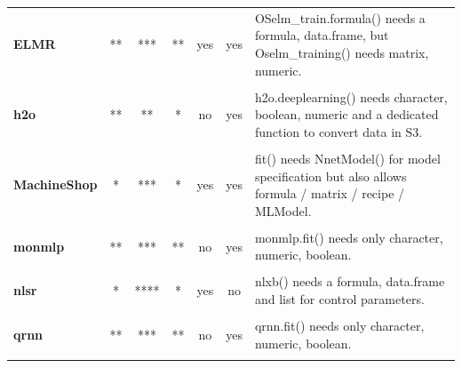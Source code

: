\begin{Schunk}
\begin{table}
\begin{tabular}[t]{>{}lccccc>{\raggedright\arraybackslash}p{30em}}
\textbf{ELMR} & ** & *** & ** & yes & yes & OSelm\_train.formula() needs a formula, data.frame, but Oselm\_training() needs matrix, numeric.\\
\cellcolor{gray!6}{\textbf{EnsembleBase}} & \cellcolor{gray!6}{*} & \cellcolor{gray!6}{*} & \cellcolor{gray!6}{*} & \cellcolor{gray!6}{yes} & \cellcolor{gray!6}{no} & \cellcolor{gray!6}{Regression.Batch.Fit() needs a function for model specification and a formula.}\\
\textbf{h2o} & ** & ** & * & no & yes & h2o.deeplearning() needs character, boolean, numeric and a dedicated function to convert data in S3.\\
\cellcolor{gray!6}{\textbf{keras}} & \cellcolor{gray!6}{**} & \cellcolor{gray!6}{*} & \cellcolor{gray!6}{} & \cellcolor{gray!6}{no} & \cellcolor{gray!6}{yes} & \cellcolor{gray!6}{fit() needs multiple functions : keras\_model() for model specification and compile() to initiate model.}\\
\textbf{MachineShop} & * & *** & * & yes & yes & fit() needs NnetModel() for model specification but also allows formula / matrix / recipe / MLModel.\\
\cellcolor{gray!6}{\textbf{minpack.lm}} & \cellcolor{gray!6}{*} & \cellcolor{gray!6}{***} & \cellcolor{gray!6}{*} & \cellcolor{gray!6}{yes} & \cellcolor{gray!6}{no} & \cellcolor{gray!6}{nlsLM() needs a formula, data.frame and list for control parameters.}\\
\textbf{monmlp} & ** & *** & ** & no & yes & monmlp.fit() needs only character, numeric, boolean.\\
\cellcolor{gray!6}{\textbf{neuralnet}} & \cellcolor{gray!6}{*} & \cellcolor{gray!6}{***} & \cellcolor{gray!6}{**} & \cellcolor{gray!6}{yes} & \cellcolor{gray!6}{no} & \cellcolor{gray!6}{neuralnet() needs formula, data.frame, boolean, character.}\\
\textbf{nlsr} & * & **** & * & yes & no & nlxb() needs a formula, data.frame and list for control parameters.\\
\cellcolor{gray!6}{\textbf{nnet}} & \cellcolor{gray!6}{*} & \cellcolor{gray!6}{***} & \cellcolor{gray!6}{**} & \cellcolor{gray!6}{yes} & \cellcolor{gray!6}{yes} & \cellcolor{gray!6}{nnet() needs only character, numeric, boolean or a formula.}\\
\textbf{qrnn} & ** & *** & ** & no & yes & qrnn.fit() needs only character, numeric, boolean.\\
\cellcolor{gray!6}{\textbf{radiant.model}} & \cellcolor{gray!6}{**} & \cellcolor{gray!6}{**} & \cellcolor{gray!6}{**} & \cellcolor{gray!6}{no} & \cellcolor{gray!6}{yes} & \cellcolor{gray!6}{nn() needs only character, numeric, matrix.}\\

\end{tabular}
\end{table}
\end{Schunk}

